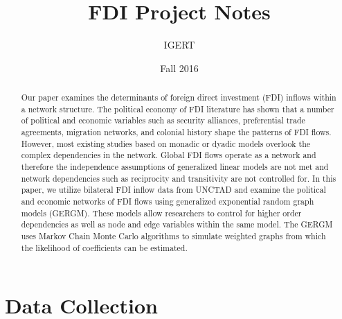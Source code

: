 \documentclass{article}
\begin{document}
\title{FDI Project Notes}
\author{IGERT}
\date{Fall 2016}
\maketitle

\singlespacing
\begin{abstract} 
    \noindent Our paper examines the determinants of foreign direct investment (FDI) inflows within a network structure. The political economy of FDI literature has shown that a number of political and economic variables such as security alliances, preferential trade agreements, migration networks, and colonial history shape the patterns of FDI flows. However, most existing studies based on monadic or dyadic models overlook the complex dependencies in the network. Global FDI flows operate as a network and therefore the independence assumptions of generalized linear models are not met and network dependencies such as reciprocity and transitivity are not controlled for. In this paper, we utilize bilateral FDI inflow data from UNCTAD and examine the political and economic networks of FDI flows using generalized exponential random graph models (GERGM). These models allow researchers to control for higher order dependencies as well as node and edge variables within the same model. The GERGM uses Markov Chain Monte Carlo algorithms to simulate weighted graphs from which the likelihood of coefficients can be estimated.

\end{abstract}

\doublespacing

\section{Data Collection}
\end{document}
